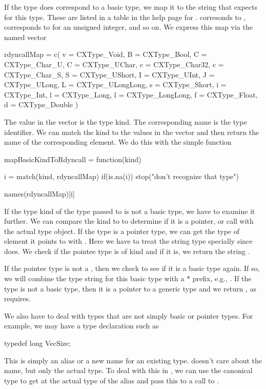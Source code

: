If the type does correspond to a basic type, we map it to 
the string that  expects for this type.
These are listed in a table in the help page for .
 corresonds to ,  corresponds
to  for an unsigned integer, and so on.
We express this map via the named \R{} vector
\begin{RCode}
rdyncallMap = c(
  v = CXType_Void,
  B = CXType_Bool,
  C = CXType_Char_U,
  C = CXType_UChar,
  c = CXType_Char32,
  c = CXType_Char_S,
  S = CXType_UShort,
  I = CXType_UInt,
  J = CXType_ULong,
  L = CXType_ULongLong,
  s = CXType_Short,
  i = CXType_Int,
  l = CXType_Long,
  l = CXType_LongLong,
  f = CXType_Float,
  d = CXType_Double
)
\end{RCode}
The value in the vector is the \libclang{} type kind. The
corresponding name is the  type identifier.
We can match the \libclang{} kind to the values in the vector and then
return the name of the corresponding element.
We do this with the simple function
\begin{RCode}
mapBasicKindToRdyncall =
function(kind)
{
  i = match(kind, rdyncallMap)
  if(is.na(i))
    stop("don't recognize that type")

  names(rdyncallMap)[i]
}
\end{RCode}
  
If the type kind of the type passed to  is not a basic
type, we have to examine it further.  We can compare the kind to
 to determine if it is a pointer, or call
 with the actual type object.  If the type is a
pointer type, we can get the type of element it points to with
.  Here we have to treat the \C{} string type
 specially since  does.  We check if the
pointee type is of kind  and if it is, we return
the  string .

If the pointee type is not a , then we check to
see if it is a basic type again. If so, we will combine the type
string for this basic type with a $\ast$ prefix, e.g., .  If
the type is not a basic type, then it is a pointer to a generic \C{}
type and we return , as  requires.

We also have to deal with types that are not simply basic or pointer
types. For example, we may have a type declaration such as
\begin{CCode}
typedef long VecSize;
\end{CCode}
This is simply an alias or a new name for an existing type.
 doesn't care about the name, but only the actual type.
To deal with this in , we can
use the canonical type to get at the actual type of the alias 
and pass this to a call to .

